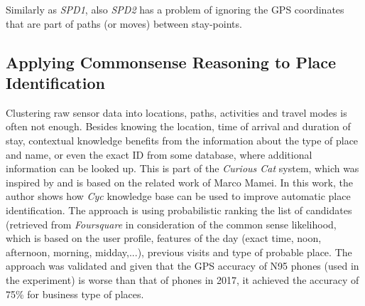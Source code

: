 Similarly as \emph{SPD1}, also \emph{SPD2} has a problem of ignoring the GPS 
coordinates that are part of paths (or moves) between stay-points.

\subsection{Applying Commonsense Reasoning to Place Identification}
\label{section:MarcoMamei}
Clustering raw sensor data into locations, paths, activities and travel modes
is often not enough. Besides knowing the location, time of arrival and duration
of stay, contextual knowledge benefits from the information about the type of
place and name, or even the exact ID from some database, where additional 
information can be looked up. This is part of the \emph{Curious Cat} system, 
which was inspired by and is based on the related work of Marco 
Mamei\parencite{Mamei2010}.
In this work, the author shows how \emph{Cyc} knowledge base can be used to
improve automatic place identification. The approach is using probabilistic
ranking the list of candidates (retrieved from \emph{Foursquare} in consideration
of the common sense likelihood, which is based on the user profile, features of
the day (exact time, noon, afternoon, morning, midday,...), previous visits
and type of probable place. The approach was validated and given that the
GPS accuracy of N95 phones (used in the experiment) is worse than that of phones
in 2017, it achieved the accuracy of 75\% for business type of places.
